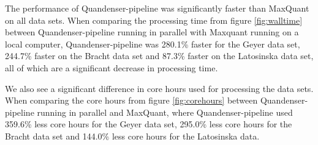 \documentclass[11pt]{article}
\begin{document}
The performance of Quandenser-pipeline was significantly faster than MaxQuant on all data sets. When comparing the processing time from figure \ref{fig:walltime} between Quandenser-pipeline running in parallel with Maxquant running on a local computer, Quandenser-pipeline was 280.1\% faster for the Geyer data set, 244.7\% faster on the Bracht data set and 87.3\% faster on the Latosinska data set, all of which are a significant decrease in processing time.

We also see a significant difference in core hours used for processing the data sets. When comparing the core hours from figure \ref{fig:corehours} between Quandenser-pipeline running in parallel and MaxQuant, where Quandenser-pipeline used 359.6\% less core hours for the Geyer data set, 295.0\% less core hours for the Bracht data set and 144.0\% less core hours for the Latosinska data.
\end{document}
